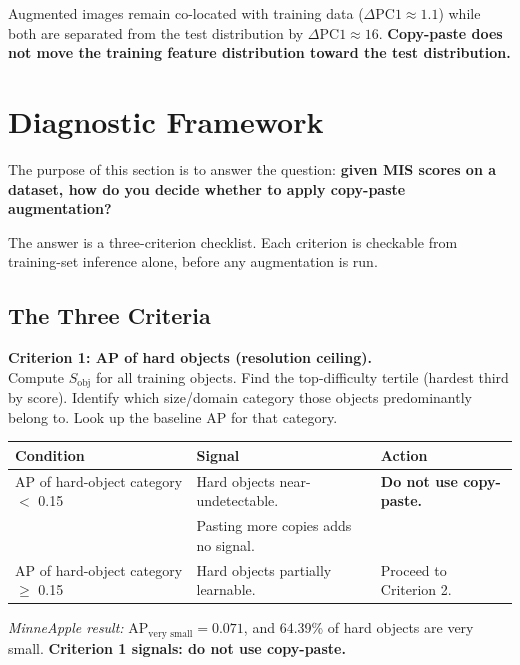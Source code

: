 \documentclass[10pt, a4paper]{article}
\begin{document}
Augmented images remain co-located with training data
($\Delta\text{PC1}\approx 1.1$) while both are separated from the
test distribution by $\Delta\text{PC1}\approx 16$.
\textbf{Copy-paste does not move the training feature distribution
toward the test distribution.}

\section{Diagnostic Framework}

The purpose of this section is to answer the question:
\textbf{given MIS scores on a dataset, how do you decide whether to
apply copy-paste augmentation?}

The answer is a three-criterion checklist.
Each criterion is checkable from training-set inference alone, before
any augmentation is run.

\subsection{The Three Criteria}

\textbf{Criterion 1: AP of hard objects (resolution ceiling).}\\
Compute $S_{\text{obj}}$ for all training objects.
Find the top-difficulty tertile (hardest third by score).
Identify which size/domain category those objects predominantly belong to.
Look up the baseline AP for that category.

\begin{center}
\small
\begin{tabular}{lll}
\toprule
\textbf{Condition} & \textbf{Signal} & \textbf{Action} \\
\midrule
AP of hard-object category $<$ 0.15
  & Hard objects near-undetectable.
  & \textbf{Do not use copy-paste.} \\
  & Pasting more copies adds no signal. & \\
AP of hard-object category $\geq$ 0.15
  & Hard objects partially learnable.
  & Proceed to Criterion 2. \\
\bottomrule
\end{tabular}
\end{center}

\textit{MinneApple result:} AP$_\text{very small}=0.071$, and 64.39\% of
hard objects are very small. \textbf{Criterion 1 signals: do not use copy-paste.}
\end{document}
